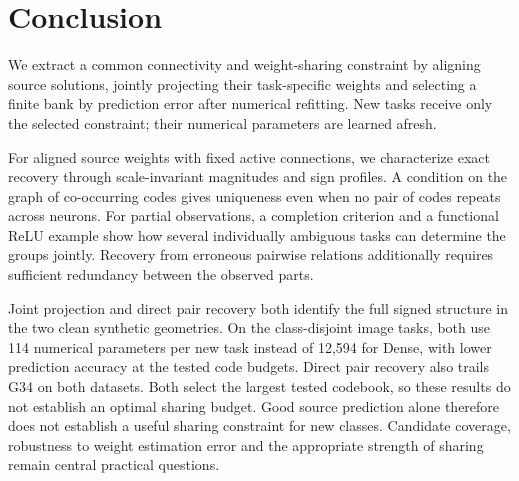 \section{Conclusion}

We extract a common connectivity and weight-sharing constraint by
aligning source solutions, jointly projecting their task-specific
weights and selecting a finite bank by prediction error after numerical
refitting. New tasks receive only the selected constraint; their
numerical parameters are learned afresh.

For aligned source weights with fixed active connections, we characterize
exact recovery through scale-invariant magnitudes and sign profiles.
A condition on the graph of co-occurring codes gives uniqueness even
when no pair of codes repeats across neurons.
For partial observations, a completion criterion and a functional
ReLU example show how several individually ambiguous tasks can
determine the groups jointly. Recovery from erroneous pairwise
relations additionally requires sufficient redundancy between
the observed parts.

Joint projection and direct pair recovery both identify the full signed
structure in the two clean synthetic geometries. On the class-disjoint
image tasks, both use 114 numerical parameters per new task instead of
12,594 for Dense, with lower prediction accuracy at the tested code
budgets. Direct pair recovery also trails G34 on both datasets.
Both select the largest tested codebook, so these results do not
establish an optimal sharing budget.
Good source prediction alone therefore does not establish a useful
sharing constraint for new classes. Candidate coverage, robustness to
weight estimation error and the appropriate strength of sharing remain
central practical questions.
